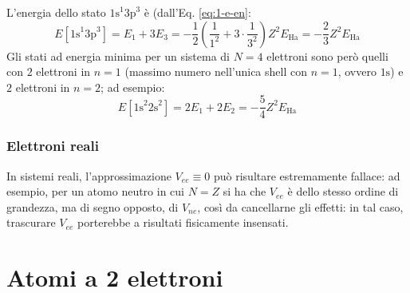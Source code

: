 \begin{example}{}{}
	L'energia dello stato $ \text{1s}^1 \text{3p}^3 $ è (dall'Eq. \ref{eq:1-e-en}:
	\begin{equation*}
		E[\text{1s}^1 \text{3p}^3] = E_1 + 3 E_3 = - \frac{1}{2} \left( \frac{1}{1^2} + 3 \cdot \frac{1}{3^2} \right) Z^2 E_\text{Ha} = - \frac{2}{3} Z^2 E_\text{Ha}
	\end{equation*}
	Gli stati ad energia minima per un sistema di $ N = 4 $ elettroni sono però quelli con $ 2 $ elettroni in $ n = 1 $ (massimo numero nell'unica shell con $ n = 1 $, ovvero $ \text{1s} $) e $ 2 $ elettroni in $ n = 2 $; ad esempio:
	\begin{equation*}
		E[\text{1s}^2 \text{2s}^2] = 2 E_1 + 2 E_2 = - \frac{5}{4} Z^2 E_\text{Ha}
	\end{equation*}
\end{example}

\subsubsection{Elettroni reali}

In sistemi reali, l'approssimazione $ V_{ee} \equiv 0 $ può risultare estremamente fallace: ad esempio, per un atomo neutro in cui $ N = Z $ si ha che $ V_{ee} $ è dello stesso ordine di grandezza, ma di segno opposto, di $ V_{ne} $, così da cancellarne gli effetti: in tal caso, trascurare $ V_{ee} $ porterebbe a risultati fisicamente insensati.

\section{Atomi a 2 elettroni}

